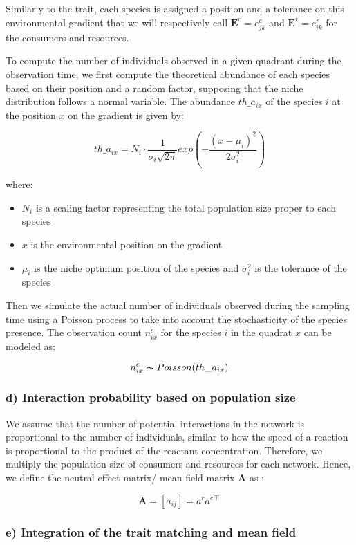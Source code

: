 Similarly to the trait, each species is assigned a position and a tolerance on this environmental gradient that we will respectively call $\mathbf{E}^c = e_{jk}^c$ and $\mathbf{E}^r = e_{ik}^r$ for the consumers and resources.

To compute the number of individuals observed in a given quadrant during the observation time, we first compute the theoretical abundance of each species based on their position and a random factor, supposing that the niche distribution follows a normal variable.
The abundance $th\_a_{ix}$ of the species $i$ at the position $x$ on the gradient is given by:

$$
    th\_a_{ix} = N_i \cdot \frac{1}{\sigma_i\sqrt{2\pi}} exp \left( -\frac{(x-\mu_i)^2}{2\sigma_i^2} \right)
$$

where:
\begin{itemize}
    \item $N_i$ is a scaling factor representing the total population size proper to each species
    \item $x$ is the environmental position on the gradient
    \item $\mu_i$ is the niche optimum position of the species and $\sigma_i^2$ is the tolerance of the species
\end{itemize}

Then we simulate the actual number of individuals observed during the sampling time using a Poisson process to take into account the stochasticity of the species presence. The observation count $n_{ix}^c$ for the species $i$ in the quadrat $x$ can be modeled as:

$$
    n_{ix}^c \thicksim Poisson(th\_a_{ix})
$$

\subsubsection{d) Interaction probability based on population size}

We assume that the number of potential interactions in the network is proportional to the number of individuals, similar to how the speed of a reaction is proportional to the product of the reactant concentration. Therefore, we multiply the population size of consumers and resources for each network. 
Hence, we define the neutral effect matrix/ mean-field matrix $\mathbf{A}$ as : 

$$
    \mathbf{A} = [a_{ij}] = a^r a^{c\intercal}
$$

\subsubsection{e) Integration of the trait matching and mean field}

